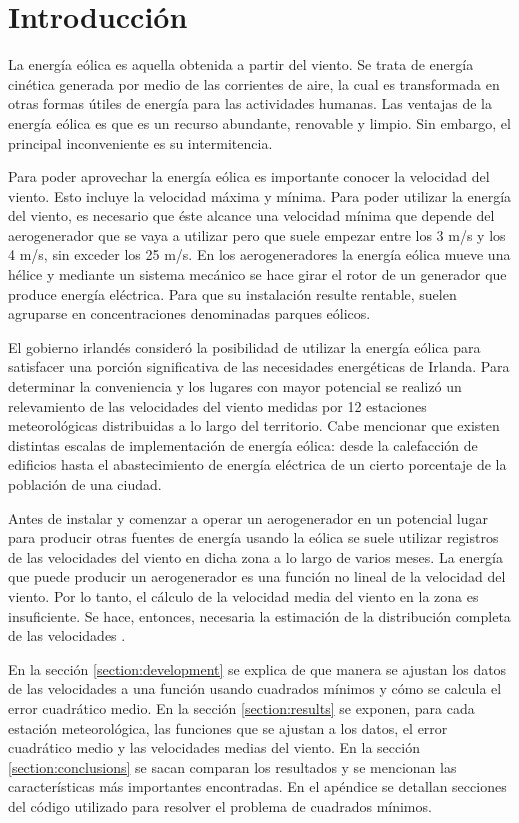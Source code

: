 \documentclass[journal, monochrome]{IEEEtran}
\begin{document}
\section{Introducción}
\par
La energía eólica es aquella obtenida a partir del viento. Se trata de energía cinética generada por medio de las corrientes de aire, la cual es transformada en otras formas útiles de energía para las actividades humanas. Las ventajas de la energía eólica es que es un recurso abundante, renovable y limpio. Sin embargo, el principal inconveniente es su intermitencia. 
\par
Para poder aprovechar la energía eólica es importante conocer la velocidad del viento. Esto incluye la velocidad máxima y mínima. Para poder utilizar la energía del viento, es necesario que éste alcance una velocidad mínima que depende del aerogenerador que se vaya a utilizar pero que suele empezar entre los 3 m/s y los 4 m/s, sin exceder los 25 m/s. En los aerogeneradores la energía eólica mueve una hélice y mediante un sistema mecánico se hace girar el rotor de un generador que produce energía eléctrica. Para que su instalación resulte rentable, suelen agruparse en concentraciones denominadas parques eólicos.
\par
El gobierno irlandés consideró la posibilidad de utilizar la energía eólica para satisfacer una porción significativa de las necesidades energéticas de Irlanda. Para determinar la conveniencia y los lugares con mayor potencial se realizó un relevamiento de las velocidades del viento medidas por 12 estaciones meteorológicas
distribuidas a lo largo del territorio. Cabe mencionar que existen distintas escalas de implementación de energía eólica: desde la calefacción de edificios hasta el abastecimiento de energía eléctrica de un cierto porcentaje de la población de una ciudad. 
\par
Antes de instalar y comenzar a operar un aerogenerador en un potencial lugar para producir otras fuentes de energía usando la eólica se suele utilizar registros de las velocidades del viento en dicha zona a lo largo de varios meses. La energía que puede producir un aerogenerador es una función no lineal de la velocidad del viento. Por lo tanto, el cálculo de la velocidad media del viento en la zona es insuficiente. Se hace, entonces, necesaria la estimación de la distribución completa de las velocidades \citep{haslett}.
\par
En la sección \ref{section:development} se explica de que manera se ajustan los datos de las velocidades a una función usando cuadrados mínimos y cómo se calcula el error cuadrático medio. En la sección \ref{section:results} se exponen, para cada estación meteorológica, las funciones que se ajustan a los datos, el error cuadrático medio y las velocidades medias del viento. En la sección \ref{section:conclusions} se sacan comparan los resultados y se mencionan las características más importantes encontradas. En el apéndice se detallan secciones del código utilizado para resolver el problema de cuadrados mínimos.
\vspace{1cm}
\end{document}
